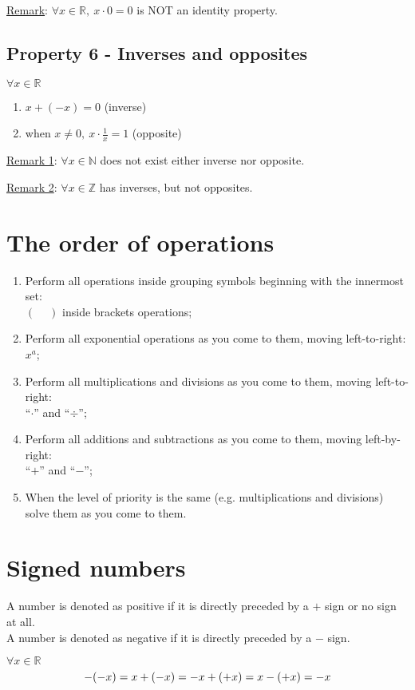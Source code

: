 \documentclass{article}
\begin{document}
\underline{Remark}: $\forall x \in \mathbb{R},\ x \cdot 0=0$ is
NOT an identity property.

\subsection{Property 6 - Inverses and opposites}
$\forall x \in \mathbb{R}$
\begin{enumerate}[label=\alph*)]
    \item $x+(-x)=0$ (inverse)
    \item when $x \neq 0,\ x \cdot \frac{1}{x}=1$ (opposite)
\end{enumerate}

\underline{Remark 1}: $\forall x \in \mathbb{N}$ does not exist either
inverse nor opposite.

\underline{Remark 2}: $\forall x \in \mathbb{Z}$ has inverses, but
not opposites.

\section{The order of operations}
\begin{enumerate}
    \item Perform all operations inside grouping symbols beginning with the innermost set:\\
        $\left(\phantom{-}\right)$ inside brackets operations;
    \item Perform all exponential operations as you come to them, moving left-to-right:\\
        $x^a$;
    \item Perform all multiplications and divisions as you come to them, moving left-to-right:\\
        ``$\cdot$'' and ``$\div$'';
    \item Perform all additions and subtractions as you come to them, moving left-by-right:\\
        ``$+$'' and ``$-$'';
    \item When the level of priority is the same (e.g. multiplications and divisions) solve them as you come to them.
\end{enumerate}

\section{Signed numbers}
A number is denoted as positive if it is directly preceded by a $+$ sign or no sign at all.\\
A number is denoted as negative if it is directly preceded by a $-$ sign.

$\forall x \in \mathbb{R}$
\[-(-x)=x\\
+(-x)=-x\\
+(+x)=x\\
-(+x)=-x\]
\end{document}
